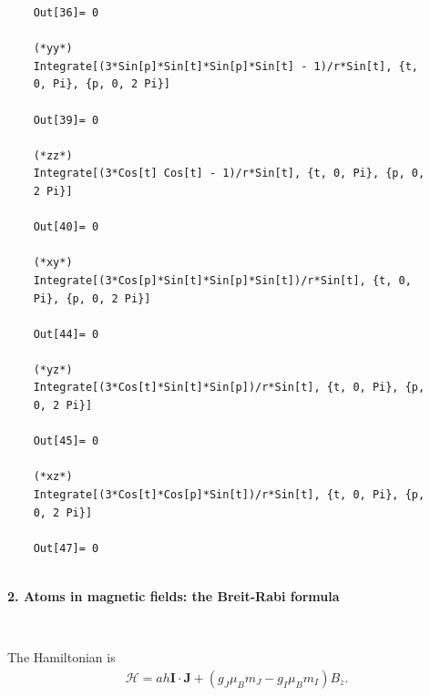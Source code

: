 \documentclass{article}
\theoremstyle{definition}
\newcommand{\ham}{\mathcal{H}}
\begin{document}
\begin{enumerate}[label=(\alph*)]
\begin{lstlisting}
	Out[36]= 0
	
	(*yy*)
	Integrate[(3*Sin[p]*Sin[t]*Sin[p]*Sin[t] - 1)/r*Sin[t], {t, 
	0, Pi}, {p, 0, 2 Pi}]
	
	Out[39]= 0
	
	(*zz*)
	Integrate[(3*Cos[t] Cos[t] - 1)/r*Sin[t], {t, 0, Pi}, {p, 0, 
	2 Pi}]
	
	Out[40]= 0
	
	(*xy*)
	Integrate[(3*Cos[p]*Sin[t]*Sin[p]*Sin[t])/r*Sin[t], {t, 0, 
	Pi}, {p, 0, 2 Pi}]
	
	Out[44]= 0
	
	(*yz*)
	Integrate[(3*Cos[t]*Sin[t]*Sin[p])/r*Sin[t], {t, 0, Pi}, {p, 
	0, 2 Pi}]
	
	Out[45]= 0
	
	(*xz*)
	Integrate[(3*Cos[t]*Cos[p]*Sin[t])/r*Sin[t], {t, 0, Pi}, {p, 
	0, 2 Pi}]
	
	Out[47]= 0
	
	\end{lstlisting}
	
	
	
\end{enumerate}



\noindent \textbf{2. Atoms in magnetic fields: the Breit-Rabi formula}

$\,$


\noindent The Hamiltonian is 
\begin{align*}
\ham = ah \bm{I}\cdot \bm{J} + (g_J \mu_B m_J - g_I \mu_B m_I) B_z.
\end{align*}
\end{document}
